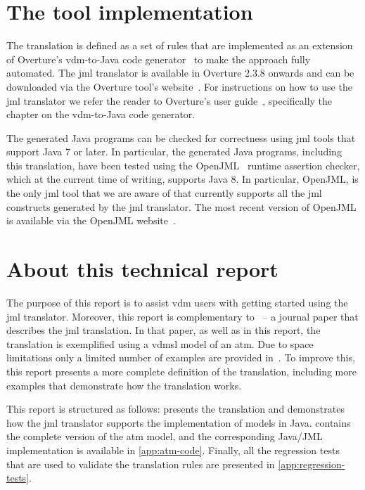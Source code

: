\section{The tool implementation}

The translation is defined as a set of rules that are implemented as
an extension of Overture's \ac{vdm}-to-Java code
generator~\cite{Jorgensen&14a} to make the approach fully
automated. The \ac{jml} translator is available in Overture 2.3.8
onwards and can be downloaded via the Overture tool's
website~\cite{Overture}. For instructions on how to use the \ac{jml}
translator we refer the reader to Overture's user
guide~\cite{Larsen&10d}, specifically the chapter on the
\ac{vdm}-to-Java code generator.

The generated Java programs can be checked for correctness using
\ac{jml} tools that support Java 7 or later. In particular, the
generated Java programs, including this translation, have been tested
using the OpenJML~\cite{Cok&11} runtime assertion checker, which at
the current time of writing, supports Java 8. In particular, OpenJML,
is the only \ac{jml} tool that we are aware of that currently supports
all the \ac{jml} constructs generated by the \ac{jml} translator. The
most recent version of OpenJML is available via the OpenJML
website~\cite{OpenJMLWebsite}.

\newpage

\section{About this technical report}

The purpose of this report is to assist \ac{vdm} users with getting
started using the \ac{jml} translator. Moreover, this report is
complementary to~\cite{Jorgensen&16a} -- a journal paper that
describes the \ac{jml} translation. In that paper, as well as in this
report, the translation is exemplified using a \ac{vdmsl} model of an
\ac{atm}. Due to space limitations only a limited number of examples
are provided in~\cite{Jorgensen&16a}. To improve this, this report
presents a more complete definition of the translation, including more
examples that demonstrate how the translation works.

This report is structured as follows:  presents the
translation and demonstrates how the \ac{jml} translator supports the
implementation of \vsl models in Java.  contains
the complete version of the \ac{atm} model, and the corresponding
Java/JML implementation is available in \cref{app:atm-code}. Finally,
all the regression tests that are used to validate the translation
rules are presented in \cref{app:regression-tests}.

